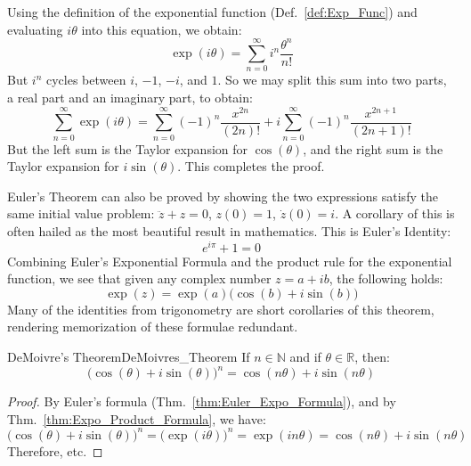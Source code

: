     \begin{bproof}
        Using the definition of the exponential function
        (Def.~\ref{def:Exp_Func}) and evaluating $i\theta$ into this
        equation, we obtain:
        \begin{equation}
            \label{def:Exp_Func_With_it}%
            \exp(i\theta)=\sum_{n=0}^{\infty}i^{n}\frac{\theta^{n}}{n!}
        \end{equation}
        But $i^{n}$ cycles between $i$, $\minus{1}$, $\minus{i}$, and $1$.
        So we may split this sum into two parts, a real part and an
        imaginary part, to obtain:
        \begin{equation}
            \sum_{n=0}^{\infty}\exp(i\theta)
                =\sum_{n=0}^{\infty}(\minus{1})^{n}\frac{x^{2n}}{(2n)!}
               +i\sum_{n=0}^{\infty}(\minus{1})^{n}
                    \frac{x^{2n+1}}{(2n+1)!}
        \end{equation}
        But the left sum is the Taylor expansion for $\cos(\theta)$,
        and the right sum is the Taylor expansion for $i\sin(\theta)$.
        This completes the proof.
    \end{bproof}
    Euler's Theorem can also be proved by showing the two expressions
    satisfy the same initial value problem: $\ddot{z}+z=0$, $z(0)=1$,
    $\dot{z}(0)=i$. A corollary of this is often hailed as the most
    beautiful result in mathematics. This is Euler's Identity:
    \begin{equation}
        e^{i\pi}+1=0
    \end{equation}
    Combining Euler's Exponential Formula and the product rule for the
    exponential function, we see that given any complex number $z=a+ib$,
    the following holds:
    \begin{equation}
        \exp(z)=\exp(a)\big(\cos(b)+i\sin(b)\big)
    \end{equation}
    Many of the identities from trigonometry are short corollaries of this
    theorem, rendering memorization of these formulae redundant.
    \begin{ltheorem}{DeMoivre's Theorem}{DeMoivres_Theorem}
        If $n\in\mathbb{N}$ and if $\theta\in\mathbb{R}$, then:
        \begin{equation}
            \big(\cos(\theta)+i\sin(\theta)\big)^{n}
            =\cos(n\theta)+i\sin(n\theta)
        \end{equation}
    \end{ltheorem}
    \begin{proof}
        By Euler's formula (Thm.~\ref{thm:Euler_Expo_Formula}), and by
        Thm.~\ref{thm:Expo_Product_Formula}, we have:
        \begin{equation}
            \big(\cos(\theta)+i\sin(\theta)\big)^{n}
                =\big(\exp(i\theta)\big)^{n}
                =\exp(in\theta)
                =\cos(n\theta)+i\sin(n\theta)
        \end{equation}
        Therefore, etc.
    \end{proof}

